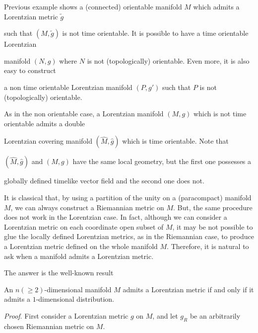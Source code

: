 Previous example shows a (connected) orientable manifold $M$ which admits a Lorentzian metric ${\tilde g}$

such that $(M,{\tilde g})$ is not time orientable. It is possible to have a time orientable Lorentzian

manifold $(N,g)$ where $N$ is not (topologically) orientable. Even more, it is also easy to construct

a non time orientable Lorentzian manifold $(P,g')$ such that $P$ is not (topologically) orientable.


As in the non orientable case, a Lorentzian manifold $(M,g)$ which is not time orientable admits a double

Lorentzian covering manifold $({\hat M},{\hat g})$ which is time orientable. Note that

$({\hat M}, {\hat g})$ and $(M,g)$ have the same local geometry, but the first one possesses a

globally defined timelike vector field and the second one does not.





It is classical that, by using a partition of the unity on a (paracompact) manifold $M$, we can always construct a Riemannian metric on $M$. But, the same procedure does not work in the Lorentzian case. In fact, although we can consider a Lorentzian metric on each coordinate open subset of $M$, it may be not possible to glue the locally defined Lorentzian metrics, as in the Riemannian case, to produce a Lorentzian metric defined on the whole manifold $M$. Therefore, it is natural to ask when a manifold admits a Lorentzian metric.

The answer is the well-known result \cite{greub72}

\begin{pro}\label{line_fields}

An $n(\geq 2)$-dimensional manifold $M$ admits a Lorentzian metric if and only if it admits a $1$-dimensional distribution.

\end{pro}

\emph{Proof}. First consider a Lorentzian metric $g$ on $M$, and let $g_R$ be an arbitrarily chosen Riemannian metric on $M$.

